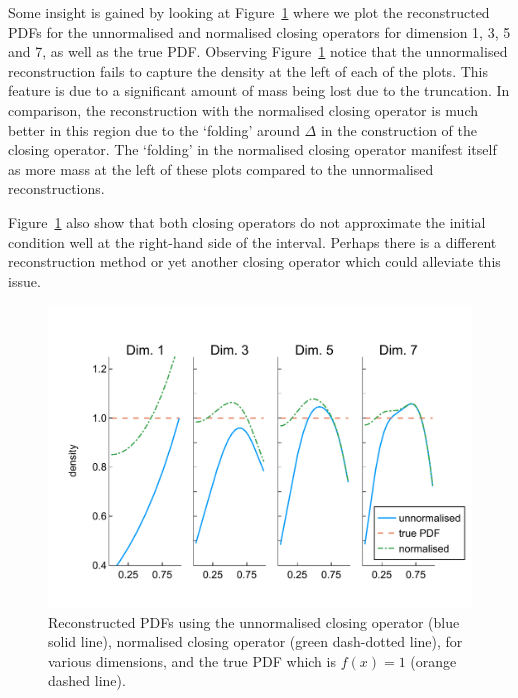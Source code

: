 \begin{example}
Some insight is gained by looking at Figure~\ref{fig: pdf reconstructed} where we plot the reconstructed PDFs for the unnormalised and normalised closing operators for dimension 1, 3, 5 and 7, as well as the true PDF. Observing Figure~\ref{fig: pdf reconstructed} notice that the unnormalised reconstruction fails to capture the density at the left of each of the plots. This feature is due to a significant amount of mass being lost due to the truncation. In comparison, the reconstruction with the normalised closing operator is much better in this region due to the `folding' around \(\Delta\) in the construction of the closing operator. The `folding' in the normalised closing operator manifest itself as more mass at the left of these plots compared to the unnormalised reconstructions. %

Figure~\ref{fig: pdf reconstructed} also show that both closing operators do not approximate the initial condition well at the right-hand side of the interval. Perhaps there is a different reconstruction method or yet another closing operator which could alleviate this issue. 
\begin{figure}[h]
	\centering
	\includegraphics[width=\textwidth,trim={0cm 1.25cm 0cm 1.25cm},clip]{chapter6/figs/qbdrap_closing_vec/fun4/pdfs_formatted.pdf}
	\caption{Reconstructed PDFs using the unnormalised closing operator (blue solid line), normalised closing operator (green dash-dotted line), for various dimensions, and the true PDF which is \(f(x)=1\) (orange dashed line).}
	\label{fig: pdf reconstructed}
\end{figure} 
\exampleFloatBarrier
\end{example}


